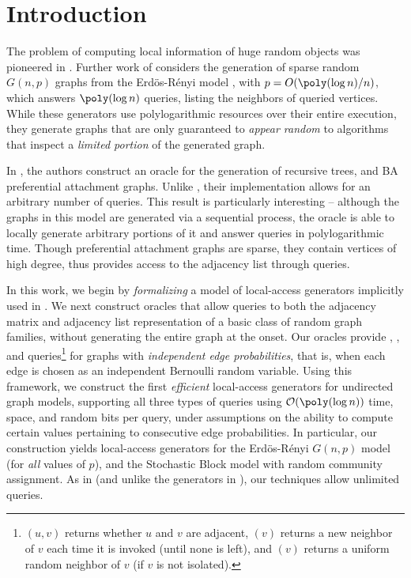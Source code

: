 \section{Introduction}

The problem of computing local information of huge random objects
was pioneered in \cite{huge_old,huge}. 
Further work of \cite{sparse} considers the generation of sparse random $G(n,p)$ graphs
from the Erd\"{o}s-R\'{e}nyi model \cite{er}, with $p = O(\poly(\log n)/n)$,
which answers $\poly(\log n)$  queries,
listing the neighbors of queried vertices.
While these generators use polylogarithmic resources over their entire execution, 
they generate graphs that are  only guaranteed to {\em appear random} to algorithms
that inspect a {\em limited portion} of the generated graph.

In \cite{reut}, the authors construct an oracle for the generation of recursive trees,
and BA preferential attachment graphs.
Unlike \cite{sparse}, their implementation allows for an arbitrary number of queries.
This result is particularly interesting --  
although the graphs in this model are generated via a sequential process,
the oracle is able to locally generate arbitrary portions of it
and answer queries in polylogarithmic time.
Though preferential attachment graphs are sparse,
they contain vertices of high degree,
thus \cite{reut} provides access to 
the adjacency list through  queries.

In this work, we begin by \emph{formalizing} a model of local-access generators
implicitly used in \cite{reut}.
We next construct oracles that allow queries to both the adjacency matrix
and adjacency list representation of a basic class of random
graph families, without generating the entire graph at the onset.
Our oracles
provide , , and  queries\footnote{$(u,v)$ returns whether $u$ and $v$ are adjacent, $(v)$ returns a new neighbor of $v$ each time it is invoked (until none is left), and $(v)$ returns a uniform random neighbor of $v$ (if $v$ is not isolated).}
for graphs with {\em independent edge probabilities}, that is,
when each edge is chosen as an independent Bernoulli random variable. 
Using this framework, we construct the first \emph{efficient} local-access generators for undirected graph models, supporting all three types of queries
using $\mathcal{O}(\poly(\log n))$ time, space, and random bits
per query, under assumptions on the ability to compute certain values
pertaining to consecutive edge probabilities. In particular, our construction yields local-access generators for the Erd\"{o}s-R\'{e}nyi $G(n,p)$ model (for \emph{all} values of $p$), and the Stochastic Block model with random community assignment. 
As in \cite{reut} (and unlike the generators in \cite{huge_old,huge,sparse}), 
our techniques allow unlimited queries.%

